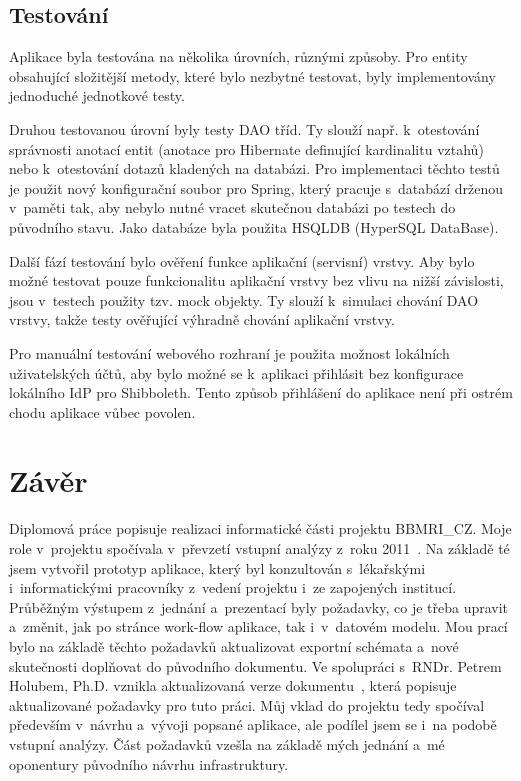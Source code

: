 \documentclass[11pt, draft, oneside]{fithesis2}
\newcommand{\ProjectName}{\mbox{BBMRI\_CZ}\xspace}
\begin{document}
\section{Testování}
Aplikace byla testována na několika úrovních, různými způsoby. Pro entity obsahující složitější metody, které bylo nezbytné testovat, byly implementovány jednoduché jednotkové testy. 

Druhou testovanou úrovní byly testy DAO tříd. Ty slouží např. k~otestování správnosti anotací entit (anotace pro Hibernate definující kardinalitu vztahů) nebo k~otestování dotazů kladených na databázi. Pro implementaci těchto testů je použit nový konfigurační soubor pro Spring, který pracuje s~databází drženou v~paměti tak, aby nebylo nutné vracet skutečnou databázi po testech do původního stavu. Jako databáze byla použita HSQLDB (HyperSQL DataBase).

Další fází testování bylo ověření funkce aplikační (servisní) vrstvy. Aby bylo možné testovat pouze funkcionalitu aplikační vrstvy bez vlivu na nižší závislosti, jsou v~testech použity tzv. mock objekty. Ty slouží k~simulaci chování DAO vrstvy, takže testy ověřující výhradně chování aplikační vrstvy.

Pro manuální testování webového rozhraní je použita možnost lokálních uživatelských účtů, aby bylo možné se k~aplikaci přihlásit bez konfigurace lokálního IdP pro Shibboleth. Tento způsob přihlášení do aplikace není při ostrém chodu aplikace vůbec povolen.


\chapter{Závěr}
Diplomová práce popisuje realizaci informatické části projektu \ProjectName. Moje role v~projektu spočívala v~převzetí vstupní analýzy z~roku 2011~\cite{ARCH_2011_12_29}. Na základě té jsem vytvořil prototyp aplikace, který byl konzultován s~lékařskými i~informatickými pracovníky z~vedení projektu i~ze zapojených institucí. Průběžným výstupem z~jednání a~prezentací byly požadavky, co je třeba upravit a~změnit, jak po stránce work-flow aplikace, tak i~v~datovém modelu. Mou prací bylo na základě těchto požadavků aktualizovat exportní schémata a~nové skutečnosti doplňovat do původního dokumentu. Ve spolupráci s~RNDr. Petrem Holubem, Ph.D. vznikla aktualizovaná verze dokumentu~\cite{ARCH_2014_1_25}, která popisuje aktualizované požadavky pro tuto práci. Můj vklad do projektu tedy spočíval především v~návrhu a~vývoji popsané aplikace, ale podílel jsem se i~na podobě vstupní analýzy. Část požadavků vzešla na základě mých jednání a~mé oponentury původního návrhu infrastruktury.
\end{document}
